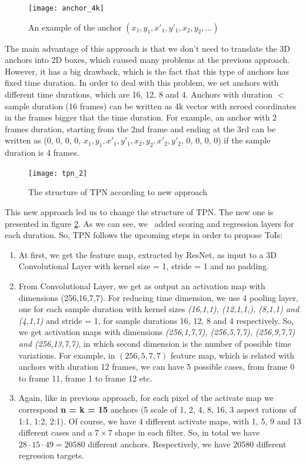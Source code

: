 \begin{figure}[h]
  \centering
  \texttt{[image: anchor\_4k]}
  \caption{An example of the anchor $(x_1,y_1,x'_1,y'_1,x_2,y_2, ...)$}
  \label{fig:anchor_4k}
\end{figure}

The main advantage of this approach is that we don't need to translate the 3D anchors into 2D boxes, which caused many problems at the previous approach.
However, it has a big drawback, which is the fact that this type of anchors has fixed time duration.
In order to deal with this problem, we set anchors with different time durations, which are 16, 12, 8 and 4.
Anchors with duration $ < $ sample duration (16 frames) can be written as 4k vector with zeroed coordinates in the frames bigger that the time duration. For example, an anchor with
2 frames duration, starting from the 2nd frame and ending at the 3rd can be written as (0, 0, 0, 0, $x_1, y_1, x'_1, y'_1, x_2, y_2, x'_2, y'_2$, 0, 0, 0, 0) if the sample
duration is 4 frames. 

\begin{figure}[h]
  \centering
  \texttt{[image: tpn\_2]}
  \caption{The structure of TPN according to new approach}
  \label{fig:New_structure}
\end{figure}

This new approach led us to change the structure of TPN. The new one  is presented in figure \ref{fig:New_structure}. As we can see, we \
added scoring and regression layers for each duration. So, TPN follows the upcoming steps in order to propose ToIs:
\begin{enumerate}
\item At first, we get the feature map, extracted by ResNet, as input to a 3D Convolutional Layer with kernel size = 1, stride = 1 and no padding.
\item From Convolutional Layer, we get as output an activation map with dimensions (256,16,7,7). For reducing time dimension, we use 4 pooling layer,
  one for each sample duration with kernel sizes \textit{(16,1,1), (12,1,1,), (8,1,1) and (4,1,1)} and stride = 1,  for sample durations 16, 12, 8 and 4 respectively.
  So, we get activation maps with dimensions \textit{(256,1,7,7), (256,5,7,7), (256,9,7,7) and (256,13,7,7)}, in which second dimension is the number of possible
  time variations. For example, in $(256,5,7,7)$ feature map, which is related with anchors with duration 12 frames, we can have 5 possible cases, from frame 0 to frame
  11, frame 1 to frame 12 etc.
  
\item Again, like in previous approach, for each pixel of the activate map we correspond \textbf{n = k = 15}
  anchors (5 scale of 1, 2, 4, 8, 16, 3 aspect rations of  1:1, 1:2, 2:1). Of course, we have 4 different activate maps, with 1, 5, 9 and 13
  different cases and a $7 \times 7$ shape in each filter. So, in total we have $28 \cdot 15 \cdot 49 = 20580$ different anchors.
  Respectively, we have 20580 different regression targets.

\end{enumerate}

